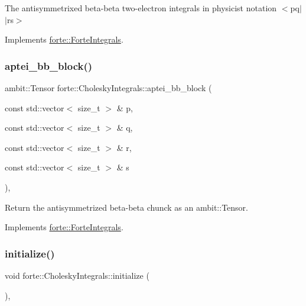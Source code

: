 The antisymmetrixed beta-\/beta two-\/electron integrals in physicist notation $<$pq$\vert$$\vert$rs$>$ 



Implements \mbox{\hyperlink{classforte_1_1_forte_integrals_a246225031c3799dc446f94e0e732c3ac}{forte\+::\+Forte\+Integrals}}.

\mbox{\label{classforte_1_1_cholesky_integrals_a87d158226e76e8897395384f78b3ce24}} 
\subsubsection{\texorpdfstring{aptei\+\_\+bb\+\_\+block()}{aptei\_bb\_block()}}
{\footnotesize\ttfamily ambit\+::\+Tensor forte\+::\+Cholesky\+Integrals\+::aptei\+\_\+bb\+\_\+block (\begin{DoxyParamCaption}\item[{const std\+::vector$<$ size\+\_\+t $>$ \&}]{p,  }\item[{const std\+::vector$<$ size\+\_\+t $>$ \&}]{q,  }\item[{const std\+::vector$<$ size\+\_\+t $>$ \&}]{r,  }\item[{const std\+::vector$<$ size\+\_\+t $>$ \&}]{s }\end{DoxyParamCaption})\hspace{0.3cm}{\ttfamily [override]}, {\ttfamily [virtual]}}



Return the antisymmetrized beta-\/beta chunck as an ambit\+::\+Tensor. 



Implements \mbox{\hyperlink{classforte_1_1_forte_integrals_ae2799dc7cbfd456603a2b841b26582ab}{forte\+::\+Forte\+Integrals}}.

\mbox{\label{classforte_1_1_cholesky_integrals_af303c4caae64a8a7231239a676cac65e}} 
\subsubsection{\texorpdfstring{initialize()}{initialize()}}
{\footnotesize\ttfamily void forte\+::\+Cholesky\+Integrals\+::initialize (\begin{DoxyParamCaption}{ }\end{DoxyParamCaption})\hspace{0.3cm}{\ttfamily [override]}, {\ttfamily [virtual]}}



